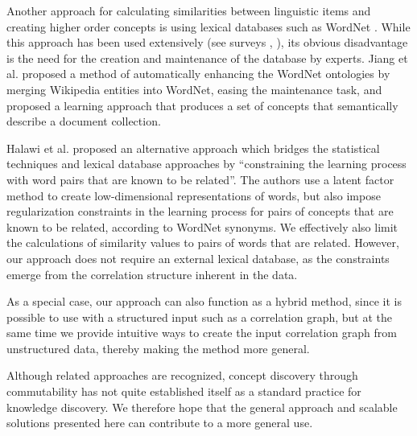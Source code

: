 \documentclass{sig-alternate}
\newcommand{\comment}[1]{{\small \color{red} {#1}} \normalcolor}
\begin{document}

Another approach for calculating similarities between linguistic items and creating higher order concepts is using
lexical databases such as WordNet \cite{miller1995wordnet}. While this approach has been used extensively
 (see surveys \cite{budanitsky2006evaluating}, \cite{lin2008survey}), its obvious disadvantage is
the need for the creation and maintenance of the database by experts. Jiang et al. \cite{jiang2011ontology} proposed a
method of automatically enhancing the WordNet ontologies by merging Wikipedia entities into WordNet, easing the
maintenance task, and proposed a learning approach that produces a set of concepts that semantically describe a
document collection.


Halawi et al. \cite{Halawi12} proposed an alternative approach which bridges
the statistical techniques and lexical database approaches by ``constraining the learning process with word pairs that
are known to be related''. The authors use a latent factor method to create low-dimensional
representations of words, but also impose regularization constraints in the learning
process for pairs of concepts that are known to be related, according to WordNet synonyms.
We effectively also limit the calculations of similarity values to pairs
of words that are related. However, our approach does not require an external lexical database, as the constraints
emerge from the correlation structure inherent in the data.

As a special case, our approach can also function as a hybrid method, since it is possible to use with a structured input
such as a correlation graph, but at the same time we provide intuitive ways to create the input correlation graph from
unstructured data, thereby making the method more general.

Although related approaches are recognized, concept discovery through commutability has
not quite established itself as a standard practice for knowledge discovery. We therefore hope that the general approach and scalable
solutions presented here can contribute to a more general use.
\end{document}
